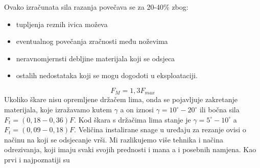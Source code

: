 \documentclass[a4paper,12pt]{article}
\numberwithin{figure}{section}
\begin{document}
Ovako izračunata sila razanja povečava se za 20-40\% zbog:
\begin{itemize}
\item tupljenja reznih ivica  moževa
\item eventualnog povečanja zračnosti među noževima
\item neravnomjernsti debljine materijala koji se odsjeca
\item ostalih nedostataka koji se mogu dogodoti u eksploataciji.
\end{itemize}
\begin{equation}
F_{M} = 1,3 F_{max}
\end{equation}
Ukoliko škare nisu opremljene držačem lima, onda se pojavljuje zakretanje materijala, koje izražavamo kutem $\gamma$ a on iznosi $\gamma = 10^{\circ} - 20^{\circ}$ ili bočna sila $F_{t} = (0,18 - 0,36)F$. Kod škara s držačima lima stanje je $\gamma = 5^{\circ}-10^{\circ}$ a $F_{t} = (0,09 - 0,18)F$. Veličina instalirane snage u uređaju za rezanje ovisi o načinu na koji se odsjecanje vrši. Mi razlikujemo više tehnika i načina odrezivanja, koji imaju svaki svojih prednosti i mana a i posebnih namjena. Kao prvi i najpoznatiji su 
\end{document}
